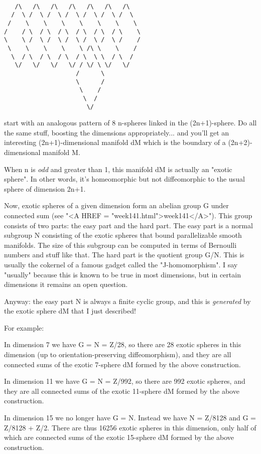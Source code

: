\begin{verbatim}

   /\   /\   /\   /\   /\   /\   /\ 
  /  \ /  \ /  \ /  \ /  \ /  \ /  \
 /    \    \    \    \    \    \    \
/    / \  / \  / \  / \  / \  / \    \ 
\    \ /  \ /  \ /  \ /  \ /  \ /    / 
 \    \    \    \    \ /\ \    \    /
  \  / \  / \  / \  / \  \ \  / \  /
   \/   \/   \/   \/ / \/ \ \/   \/
                    /      \ 
                    \      /
                     \    /
                      \  /
                       \/ 
\end{verbatim}
    
start with an analogous pattern of 8 n-spheres linked in the (2n+1)-sphere.
Do all the same stuff, boosting the dimensions appropriately... and you'll
get an interesting (2n+1)-dimensional manifold dM which is the boundary of 
a (2n+2)-dimensional manifold M.  

When n is \emph{odd} and greater than 1, this manifold dM is actually an
"exotic sphere".  In other words, it's homeomorphic but not
diffeomorphic to the usual sphere of dimension 2n+1.

Now, exotic spheres of a given dimension form an abelian group G under
connected sum (see "<A HREF = "week141.html">week141</A>").
This group consists of two parts: the easy part and the hard part.  The
easy part is a normal subgroup N consisting of the exotic spheres that
bound parallelizable smooth manifolds.  The size of this subgroup can be
computed in terms of Bernoulli numbers and stuff like that.  The hard
part is the quotient group G/N.  This is usually the cokernel of a
famous gadget called the "J-homomorphism".  I say
"usually" because this is known to be true in most dimensions,
but in certain dimensions it remains an open question.

Anyway: the easy part N is always a finite cyclic group, and this is
\emph{generated} by the exotic sphere dM that I just described!   

For example: 

In dimension 7 we have G = N = Z/28, so there are 28 exotic spheres in
this dimension (up to orientation-preserving diffeomorphism), and they 
are all connected sums of the exotic 7-sphere dM formed by the above 
construction.   

In dimension 11 we have G = N = Z/992, so there are 992 exotic spheres,
and they are all connected sums of the exotic 11-sphere dM formed by the 
above construction.

In dimension 15 we no longer have G = N.  Instead we have N = Z/8128
and G = Z/8128 + Z/2.  There are thus 16256 exotic spheres in this
dimension, only half of which are connected sums of the exotic 15-sphere 
dM formed by the above construction.

